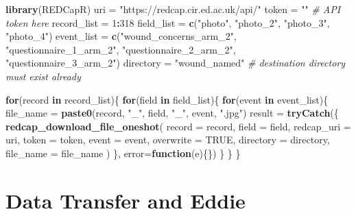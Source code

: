 \documentclass[
]{book}
\newenvironment{Shaded}{\begin{snugshade}}{\end{snugshade}}
\newcommand{\CommentTok}[1]{\textcolor[rgb]{0.56,0.35,0.01}{\textit{#1}}}
\newcommand{\ControlFlowTok}[1]{\textcolor[rgb]{0.13,0.29,0.53}{\textbf{#1}}}
\newcommand{\DataTypeTok}[1]{\textcolor[rgb]{0.13,0.29,0.53}{#1}}
\newcommand{\DecValTok}[1]{\textcolor[rgb]{0.00,0.00,0.81}{#1}}
\newcommand{\KeywordTok}[1]{\textcolor[rgb]{0.13,0.29,0.53}{\textbf{#1}}}
\newcommand{\NormalTok}[1]{#1}
\newcommand{\OperatorTok}[1]{\textcolor[rgb]{0.81,0.36,0.00}{\textbf{#1}}}
\newcommand{\OtherTok}[1]{\textcolor[rgb]{0.56,0.35,0.01}{#1}}
\newcommand{\StringTok}[1]{\textcolor[rgb]{0.31,0.60,0.02}{#1}}
\begin{document}
\begin{Shaded}
\begin{Highlighting}[]
\KeywordTok{library}\NormalTok{(REDCapR)}
\NormalTok{uri =}\StringTok{ "https://redcap.cir.ed.ac.uk/api/"}
\NormalTok{token =}\StringTok{ ""} \CommentTok{# API token here}
\NormalTok{record_list =}\StringTok{ }\DecValTok{1}\OperatorTok{:}\DecValTok{318}
\NormalTok{field_list =}\StringTok{ }\KeywordTok{c}\NormalTok{(}\StringTok{"photo"}\NormalTok{, }\StringTok{"photo_2"}\NormalTok{, }\StringTok{"photo_3"}\NormalTok{, }\StringTok{"photo_4"}\NormalTok{)}
\NormalTok{event_list =}\StringTok{ }\KeywordTok{c}\NormalTok{(}\StringTok{"wound_concerns_arm_2"}\NormalTok{, }\StringTok{"questionnaire_1_arm_2"}\NormalTok{,}
               \StringTok{"questionnaire_2_arm_2"}\NormalTok{, }\StringTok{"questionnaire_3_arm_2"}\NormalTok{)}
\NormalTok{directory =}\StringTok{ "wound_named"} \CommentTok{# destination directory must exist already}

\ControlFlowTok{for}\NormalTok{(record }\ControlFlowTok{in}\NormalTok{ record_list)\{}
  \ControlFlowTok{for}\NormalTok{(field }\ControlFlowTok{in}\NormalTok{ field_list)\{}
    \ControlFlowTok{for}\NormalTok{(event }\ControlFlowTok{in}\NormalTok{ event_list)\{}
\NormalTok{      file_name =}\StringTok{ }\KeywordTok{paste0}\NormalTok{(record, }\StringTok{"_"}\NormalTok{, field, }\StringTok{"_"}\NormalTok{, event, }\StringTok{".jpg"}\NormalTok{)}
\NormalTok{      result =}\StringTok{ }
\StringTok{        }\KeywordTok{tryCatch}\NormalTok{(\{}
          \KeywordTok{redcap_download_file_oneshot}\NormalTok{(}
            \DataTypeTok{record        =}\NormalTok{ record,}
            \DataTypeTok{field         =}\NormalTok{ field,}
            \DataTypeTok{redcap_uri    =}\NormalTok{ uri,}
            \DataTypeTok{token         =}\NormalTok{ token,}
            \DataTypeTok{event         =}\NormalTok{ event,}
            \DataTypeTok{overwrite     =} \OtherTok{TRUE}\NormalTok{,}
            \DataTypeTok{directory     =}\NormalTok{ directory,}
            \DataTypeTok{file_name     =}\NormalTok{ file_name}
\NormalTok{          )}
\NormalTok{        \}, }\DataTypeTok{error=}\ControlFlowTok{function}\NormalTok{(e)\{\})}
\NormalTok{    \}}
\NormalTok{  \}}
\NormalTok{\}}
\end{Highlighting}
\end{Shaded}

\hypertarget{data-transfer-and-eddie}{%
\chapter{Data Transfer and Eddie}\label{data-transfer-and-eddie}}
\end{document}
